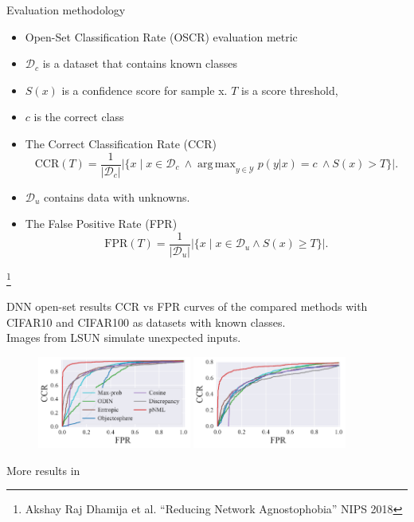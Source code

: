 \documentclass[aspectratio=169]{beamer}
\newcommand\blfootnote[1]{%
  \begingroup
  \renewcommand\thefootnote{}\footnote{#1}%
  \addtocounter{footnote}{-1}%
  \endgroup
}
\DeclareMathOperator*{\argmax}{arg\,max}
\def\Dc{\mathcal{D}_c}
\def\Du{\mathcal{D}_u}
\begin{document}
\begin{frame}{Evaluation methodology}
\begin{itemize}
\item  Open-Set Classification Rate (OSCR) evaluation metric
\item  $\mathcal{D}_c$ is a dataset that contains known classes
\item  $S(x)$ is a confidence score for sample x. $T$ is a score threshold, 
\item $c$ is the correct class
\item  The Correct Classification Rate (CCR) 
    \begin{equation}  \label{eq:ccr}
    \mathrm{CCR}(T) = \frac{1}{|\Dc|}\bigl|\{x \mid  x \in \Dc \  \wedge 
    \argmax_{y \in \mathcal{Y}} p(y|x) = c \ \wedge 
    S(x) > T \}\bigr|.
    \end{equation}
\item $\mathcal{D}_u$ contains data with unknowns.
\item The False Positive Rate (FPR)
    \begin{equation}  \label{eq:fpr}
        \mathrm{FPR}(T) =  \frac{1}{|\Du|} \left|\{x \mid x \in \Du \wedge S(x) \geq T \}\right|.
    \end{equation}
\end{itemize}
\blfootnote{Akshay Raj Dhamija et al. ``Reducing Network Agnostophobia'' NIPS 2018}
\end{frame}


\begin{frame}{DNN open-set results}
CCR vs FPR curves of the compared methods with CIFAR10 and CIFAR100  as datasets with known classes. \\
Images from LSUN simulate unexpected inputs. 

\begin{figure}[h]
\includegraphics[width=0.45\textwidth]{figures/dnn_openset_figures/figure_pnml_densenet100_cifar10_lsun.pdf}
\includegraphics[width=0.45\textwidth]{figures/dnn_openset_figures/figure_pnml_wrn16_cifar100_lsun.pdf}
\end{figure}
More results in 
\end{frame}
\end{document}
